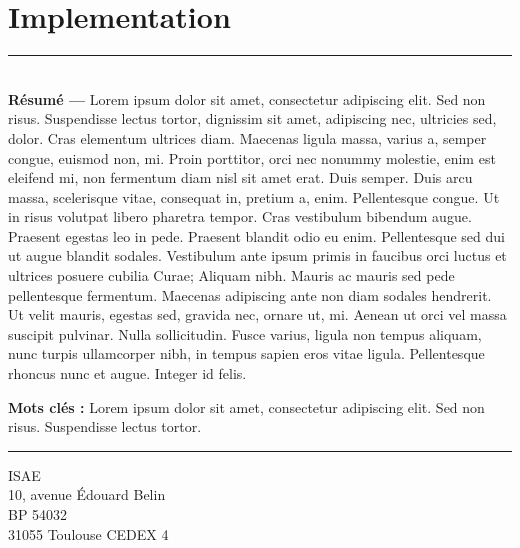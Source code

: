 \documentclass[a4paper,12pt]{book}
\theoremstyle{break}
\begin{document}
\chapter{Implementation}






\appendix




\clearpage


\thispagestyle{empty}

\vspace*{\fill}
\noindent\rule[2pt]{\textwidth}{0.5pt}\\
{\textbf{Résumé ---}}
Lorem ipsum dolor sit amet, consectetur adipiscing elit. Sed non risus. Suspendisse lectus tortor, dignissim sit amet, adipiscing nec, ultricies sed, dolor. Cras elementum ultrices diam. Maecenas ligula massa, varius a, semper congue, euismod non, mi. Proin porttitor, orci nec nonummy molestie, enim est eleifend mi, non fermentum diam nisl sit amet erat. Duis semper. Duis arcu massa, scelerisque vitae, consequat in, pretium a, enim. Pellentesque congue. Ut in risus volutpat libero pharetra tempor. Cras vestibulum bibendum augue. Praesent egestas leo in pede. Praesent blandit odio eu enim. Pellentesque sed dui ut augue blandit sodales. Vestibulum ante ipsum primis in faucibus orci luctus et ultrices posuere cubilia Curae; Aliquam nibh. Mauris ac mauris sed pede pellentesque fermentum. Maecenas adipiscing ante non diam sodales hendrerit. Ut velit mauris, egestas sed, gravida nec, ornare ut, mi. Aenean ut orci vel massa suscipit pulvinar. Nulla sollicitudin. Fusce varius, ligula non tempus aliquam, nunc turpis ullamcorper nibh, in tempus sapien eros vitae ligula. Pellentesque rhoncus nunc et augue. Integer id felis.

{\textbf{Mots clés :}}
Lorem ipsum dolor sit amet, consectetur adipiscing elit. Sed non risus. Suspendisse lectus tortor.
\\
\noindent\rule[2pt]{\textwidth}{0.5pt}
\begin{center}
  ISAE\\
  10, avenue Édouard Belin\\
  BP 54032\\
  31055 Toulouse CEDEX 4
\end{center}
\vspace*{\fill}
\end{document}
